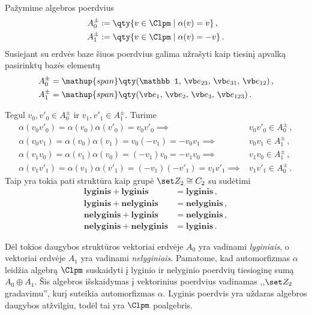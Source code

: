 Pažymime algebros poerdvius
\begin{equation}
	\begin{split}
		A_0^\pm &:= \qty{
			v \in \Clpm \mid \alpha(v)=v
		}
		\,,
		\\
		A_1^\pm &:= \qty{
			v \in \Clpm \mid \alpha(v)=-v
		}
		\,.
	\end{split}
\end{equation}
Susiejant su erdvės baze šiuos poerdvius galima užrašyti kaip
tiesinį apvalką pasirinktų bazės elementų
\begin{equation}
	\begin{aligned}
		A_0^\pm &= \mathup{span}\qty(
			\mathbb 1,\,
			\vb e_{23},\,
			\vb e_{31},\,
			\vb e_{12}
		)
		\,,
		\\
		A_1^\pm &= \mathup{span}\qty(
			\vb e_1 ,\,
			\vb e_2 ,\,
			\vb e_3 ,\,
			\vb e_{123}
		)
		\,.
	\end{aligned}
\end{equation}

\begin{example}
	Tegul $v_0, v'_0 \in A_0^\pm$ ir $v_1, v'_1 \in A_1^\pm$. Turime
	\begin{equation}
		\begin{split}
			\alpha(v_0 v'_0)
			= \alpha(v_0)\alpha(v'_0)
			= v_0 v'_0
			\implies &
			v_0 v'_0 \in A_0^\pm
			\,,
			\\
			\alpha(v_0 v_1)
			= \alpha(v_0)\alpha(v_1)
			= v_0 (-v_1)
			= - v_0 v_1
			\implies &
			v_0 v_1 \in A_1^\pm
			\,,
			\\
			\alpha(v_1 v_0)
			= \alpha(v_1)\alpha(v_0)
			= (- v_1)v_0
			= - v_1 v_0
			\implies &
			v_1 v_0 \in A_1^\pm
			\,,
			\\
			\alpha(v_1 v'_1)
			= \alpha(v_1)\alpha(v'_1)
			= (- v_1)(- v'_1)
			= v_1 v'_1
			\implies &
			v_1 v'_1 \in A_0^\pm
			\,.
		\end{split}
	\end{equation}
	Taip yra tokia pati struktūra kaip grupė 
	$\set Z_2 \cong C_2$ su sudėtimi
	\begin{equation}
		\begin{split}
			\mathbf{lyginis} + \mathbf{lyginis} &= \mathbf{lyginis}
			\,,
			\\
			\mathbf{lyginis} + \mathbf{nelyginis} &= \mathbf{nelyginis}
			\,,
			\\
			\mathbf{nelyginis} + \mathbf{lyginis} &= \mathbf{nelyginis}
			\,,
			\\
			\mathbf{nelyginis} + \mathbf{nelyginis} &= \mathbf{lyginis}
			\,.
		\end{split}
	\end{equation}
\end{example}
Dėl tokios daugybos struktūros vektoriai erdvėje $A_0$ yra vadinami \emph{lyginiais},
o vektoriai erdvėje $A_1$ yra vadinami \emph{nelyginiais}.
Pamatome, kad automorfizmas $\alpha$ 
leidžia algebrą $\Clpm$ suskaidyti 
į lyginio ir nelyginio poerdvių tiesioginę sumą $A_0 \oplus A_1$.
Šis algebros išskaidymas į vektorinius poerdvius vadinamas
,,$\set Z_2$ gradavimu'', kurį suteikia automorfizmas $\alpha$.
Lyginis poerdvis yra uždaras algebros daugybos atžvilgiu,
todėl tai yra $\Clpm$ poalgebris.

